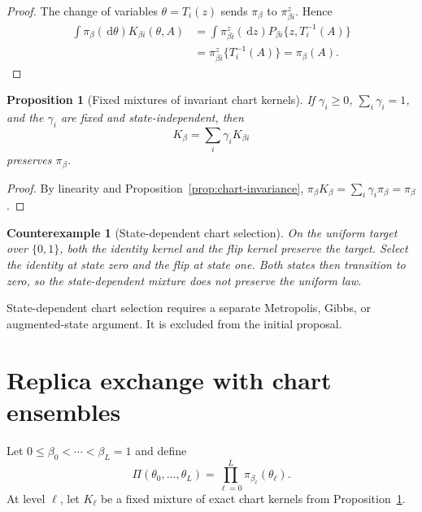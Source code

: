 \documentclass[11pt]{article}
\newtheorem{proposition}[theorem]{Proposition}
\newtheorem{counterexample}[theorem]{Counterexample}
\theoremstyle{definition}
\theoremstyle{remark}
\newcommand{\1}{\mathbf{1}}
\newcommand{\dd}{\,\mathrm{d}}
\begin{document}
\begin{proof}
The change of variables $\theta=T_i(z)$ sends $\pi_\beta$ to
$\pi_{\beta i}^z$.  Hence
\begin{align*}
 \int\pi_\beta(\dd\theta)K_{\beta i}(\theta,A)
 &=\int\pi_{\beta i}^z(\dd z)
      P_{\beta i}\{z,T_i^{-1}(A)\}\\
 &=\pi_{\beta i}^z\{T_i^{-1}(A)\}
 =\pi_\beta(A).
\end{align*}
\end{proof}

\begin{proposition}[Fixed mixtures of invariant chart kernels]
\label{prop:kernel-mixture}
If $\gamma_i\geq0$, $\sum_i\gamma_i=1$, and the $\gamma_i$ are fixed and
state-independent, then
\begin{equation}
 K_\beta=\sum_i\gamma_iK_{\beta i}
 \label{eq:kernel-mixture}
\end{equation}
preserves $\pi_\beta$.
\end{proposition}

\begin{proof}
By linearity and Proposition~\ref{prop:chart-invariance},
$\pi_\beta K_\beta=\sum_i\gamma_i\pi_\beta=\pi_\beta$.
\end{proof}

\begin{counterexample}[State-dependent chart selection]
\label{counter:state-dependent-mixture}
On the uniform target over $\{0,1\}$, both the identity kernel and the flip
kernel preserve the target.  Select the identity at state zero and the flip at
state one.  Both states then transition to zero, so the state-dependent mixture
does not preserve the uniform law.
\end{counterexample}

State-dependent chart selection requires a separate Metropolis, Gibbs, or
augmented-state argument.  It is excluded from the initial proposal.

\section{Replica exchange with chart ensembles}

Let $0\leq\beta_0<\cdots<\beta_L=1$ and define
\begin{equation}
 \Pi(\theta_0,\ldots,\theta_L)
 =\prod_{\ell=0}^L\pi_{\beta_\ell}(\theta_\ell).
 \label{eq:product-target}
\end{equation}
At level $\ell$, let $K_\ell$ be a fixed mixture of exact chart kernels from
Proposition~\ref{prop:kernel-mixture}.
\end{document}
